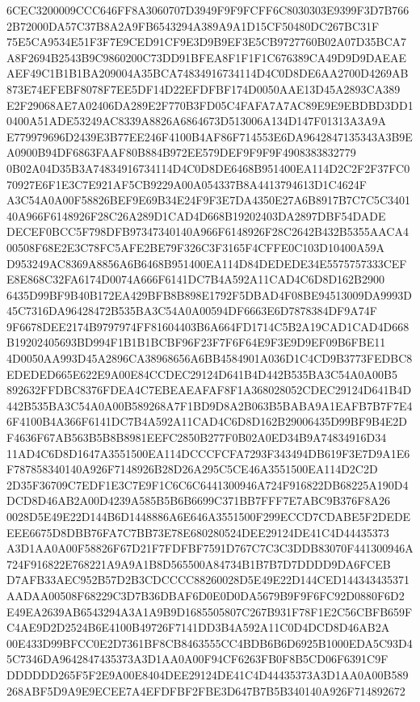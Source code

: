 \documentclass[UTF8,fontset=fandol,zihao=-4,a4paper]{ctexart}
\begin{document}
{{6CEC3200009CCC646FF8A3060707D3949F9F9FCFF6C8030303E9399F3D7B7662B72000DA57C37B8A2A9FB6543294A389A9A1D15CF50480DC267BC31F
75E5CA9534E51F3F7E9CED91CF9E3D9B9EF3E5CB9727760B02A07D35BCA7A8F2694B2543B9C9860200C73DD91BFEA8F1F1F1C676389CA49D9D9DAEAE
AEF49C1B1B1BA209004A35BCA74834916734114D4C0D8DE6AA2700D4269AB873E74EFEBF8078F7EE5DF14D22EFDFBF174D0050AAE13D45A2893CA389
E2F29068AE7A02406DA289E2F770B3FD05C4FAFA7A7AC89E9E9EBDBD3DD10400A51ADE53249AC8339A8826A6864673D513006A134D147F01313A3A9A
E779979696D2439E3B77EE246F4100B4AF86F714553E6DA9642847135343A3B9EA0900B94DF6863FAAF80B884B972EE579DEF9F9F9F4908383832779
0B02A04D35B3A74834916734114D4C0D8DE6468B951400EA114D2C2F2F37FC070927E6F1E3C7E921AF5CB9229A00A054337B8A4413794613D1C4624F
A3C54A0A00F58826BEF9E69B34E24F9F3E7DA4350E27A6B8917B7C7C5C340140A966F6148926F28C26A289D1CAD4D668B19202403DA2897DBF54DADE
DECEF0BCC5F798DFB97347340140A966F6148926F28C2642B432B5355AACA400508F68E2E3C78FC5AFE2BE79F326C3F3165F4CFFE0C103D10400A59A
D953249AC8369A8856A6B6468B951400EA114D84DEDEDE34E5575757333CEFE8E868C32FA6174D0074A666F6141DC7B4A592A11CAD4C6D8D162B2900
6435D99BF9B40B172EA429BFB8B898E1792F5DBAD4F08BE94513009DA9993D45C7316DA96428472B535BA3C54A0A00594DF6663E6D7878384DF9A74F
9F6678DEE2174B9797974FF81604403B6A664FD1714C5B2A19CAD1CAD4D668B19202405693BD994F1B1B1BCBF96F23F7F6F64E9F3E9D9EF09B6FBE11
4D0050AA993D45A2896CA38968656A6BB4584901A036D1C4CD9B3773FEDBC8EDEDED665E622E9A00E84CCDEC29124D641B4D442B535BA3C54A0A00B5
892632FFDBC8376FDEA4C7EBEAEAFAF8F1A368028052CDEC29124D641B4D442B535BA3C54A0A00B589268A7F1BD9D8A2B063B5BABA9A1EAFB7B7F7E4
6F4100B4A366F6141DC7B4A592A11CAD4C6D8D162B29006435D99BF9B4E2DF4636F67AB563B5B8B8981EEFC2850B277F0B02A0ED34B9A74834916D34
11AD4C6D8D1647A3551500EA114DCCCFCFA7293F343494DB619F3E7D9A1E6F787858340140A926F7148926B28D26A295C5CE46A3551500EA114D2C2D
2D35F36709C7EDF1E3C7E9F1C6C6C6441300946A724F916822DB68225A190D4DCD8D46AB2A00D4239A585B5B6B6699C371BB7FFF7E7ABC9B376F8A26
0028D5E49E22D144B6D1448886A6E646A3551500F299ECCD7CDABE5F2DEDEEEE6675D8DBB76FA7C7BB73E78E680280524DEE29124DE41C4D44435373
A3D1AA0A00F58826F67D21F7FDFBF7591D767C7C3C3DDB83070F441300946A724F916822E768221A9A9A1B8D565500A84734B1B7B7D7DDDD9DA6FCEB
D7AFB33AEC952B57D2B3CDCCCC88260028D5E49E22D144CED144343435371AADAA00508F68229C3D7B36DBAF6D0E0D0DA5679B9F9F6FC92D0880F6D2
E49EA2639AB6543294A3A1A9B9D1685505807C267B931F78F1E2C56CBFB659FC4AE9D2D2524B6E4100B49726F7141DD3B4A592A11C0D4DCD8D46AB2A
00E433D99BFCC0E2D7361BF8CB8463555CC4BDB6B6D6925B1000EDA5C93D45C7346DA9642847435373A3D1AA0A00F94CF6263FB0F8B5CD06F6391C9F
DDDDDD265F5F2E9A00E8404DEE29124DE41C4D44435373A3D1AA0A00B589268ABF5D9A9E9ECEE7A4EFDFBF2FBE3D647B7B5B340140A926F714892672
}}
\end{document}
